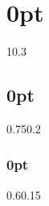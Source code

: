 
\usepackage{orcidlink} %

\usepackage{indentfirst} %
\setlength{\parindent}{0.5in} %
\setlength{\parskip}{0em} %

\usepackage{titlesec} %
\titlespacing\section{0pt}{1\baselineskip}{0.3\baselineskip}
\titlespacing\subsection{0pt}{0.75\baselineskip}{0.2\baselineskip}
\titlespacing\subsubsection{0pt}{0.6\baselineskip}{0.15\baselineskip}


\usepackage{caption}
\captionsetup{
  justification = raggedright, %
  singlelinecheck = false,     %
  labelfont = bf               %
}
\setlength{\abovecaptionskip}{10pt} %

\usepackage{rotating}
\usepackage{pdflscape}
\usepackage{float}         %
\usepackage{placeins}     %
{} %


\usepackage{abstract}
\renewcommand{\abstractname}{ABSTRACT\vspace{.5em}}
\renewcommand{\abstractnamefont}{\normalfont\bfseries}
\renewcommand{\abstracttextfont}{\normalsize}
\setlength{\absleftindent}{\parindent}
\setlength{\absrightindent}{\parindent}



